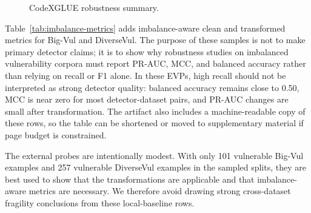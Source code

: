 \documentclass[a4paper,fleqn]{cas-dc}
\begin{document}
\begin{figure}
  \centering
  \resizebox{\columnwidth}{!}{}
  \caption{CodeXGLUE robustness summary.}
  \label{fig:robustness-summary}
\end{figure}

Table~\ref{tab:imbalance-metrics} adds imbalance-aware clean and transformed
metrics for Big-Vul and DiverseVul. The purpose of these samples is not to make
primary detector claims; it is to show why robustness studies on imbalanced
vulnerability corpora must report PR-AUC, MCC, and balanced accuracy rather
than relying on recall or F1 alone. In these EVPs, high
recall should not be interpreted as strong detector quality: balanced accuracy
remains close to 0.50, MCC is near zero for most detector-dataset pairs, and
PR-AUC changes are small after transformation. The artifact also includes a
machine-readable copy of these rows, so the table can be shortened or moved to
supplementary material if page budget is constrained.

The external probes are intentionally modest. With only 101 vulnerable Big-Vul
examples and 257 vulnerable DiverseVul examples in the sampled splits, they are
best used to show that the transformations are applicable and that
imbalance-aware metrics are necessary. We therefore avoid drawing strong
cross-dataset fragility conclusions from these local-baseline rows.

\begin{table}[t]
  \centering
  \caption{Imbalance-aware clean and transformed metrics on Big-Vul and DiverseVul.}
  \label{tab:imbalance-metrics}
\end{table}
\end{document}
